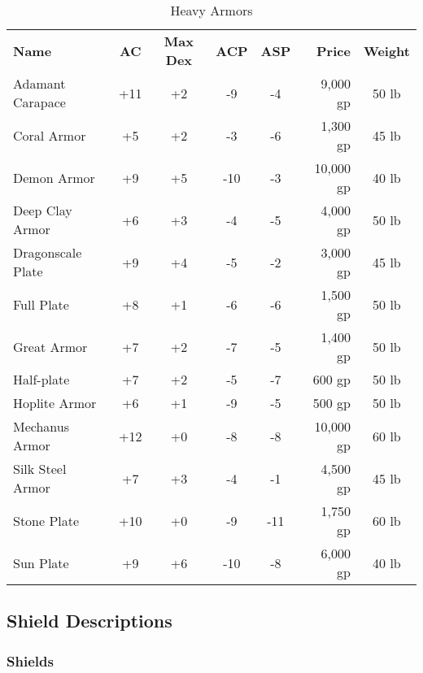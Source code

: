 \begin{table}[htb]
\caption{Heavy Armors}
\centering
\begin{tabular}{l *{4}{c} r c}
\textbf{Name} & \textbf{AC} & \textbf{Max Dex} & \textbf{ACP} & \textbf{ASP} & \textbf{Price} & \textbf{Weight}\\
Adamant Carapace & +11 & +2 & -9 & -4 & 9,000 gp & 50 lb\\
Coral Armor & +5 & +2 & -3 & -6 & 1,300 gp & 45 lb\\
Demon Armor & +9 & +5 & -10 & -3 & 10,000 gp & 40 lb\\
Deep Clay Armor & +6 & +3 & -4 & -5 & 4,000 gp & 50 lb\\
Dragonscale Plate & +9 & +4 & -5 & -2 & 3,000 gp & 45 lb\\
Full Plate & +8 & +1 & -6 & -6 & 1,500 gp & 50 lb\\
Great Armor & +7 & +2 & -7 & -5 & 1,400 gp & 50 lb\\
Half-plate & +7 & +2 & -5 & -7 & 600 gp & 50 lb\\
Hoplite Armor & +6 & +1 & -9 & -5 & 500 gp & 50 lb\\
Mechanus Armor & +12 & +0 & -8 & -8 & 10,000 gp & 60 lb\\
Silk Steel Armor & +7 & +3 & -4 & -1 & 4,500 gp & 45 lb\\
Stone Plate & +10 & +0 & -9 & -11 & 1,750 gp & 60 lb\\
Sun Plate & +9 & +6 & -10 & -8 & 6,000 gp & 40 lb\\
\end{tabular}
\end{table}


\subsection{Shield Descriptions}

\subsubsection{Shields}

